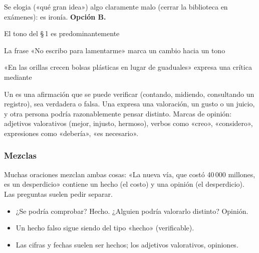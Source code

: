 \begin{retoresuelto}
Se elogia («qué gran idea») algo claramente malo (cerrar la biblioteca en exámenes): es ironía. \textbf{Opción B.}
\end{retoresuelto}

\taller
{}
\begin{ejercicios}
\item El tono del \S\,1 es predominantemente
\item La frase «No escribo para lamentarme»  marca un cambio hacia un tono
\item «En las orillas crecen bolsas plásticas en lugar de guaduales»  expresa una crítica mediante
\end{ejercicios}

\bitacora


Un  es una afirmación que se puede verificar (contando, midiendo, consultando un registro), sea verdadera o
falsa. Una  expresa una valoración, un gusto o un juicio, y otra persona podría razonablemente pensar
distinto. Marcas de opinión: adjetivos valorativos (mejor, injusto, hermoso), verbos como «creo», «considero»,
expresiones como «debería», «es necesario».

\subsubsection{Mezclas}
Muchas oraciones mezclan ambas cosas: «La nueva vía, que costó 40\,000 millones, es un desperdicio» contiene un hecho (el
costo) y una opinión (el desperdicio). Las preguntas suelen pedir separar.


\begin{regla}
\begin{itemize}
  \item ¿Se podría comprobar? Hecho. ¿Alguien podría valorarlo distinto? Opinión.
  \item Un hecho falso sigue siendo del tipo «hecho» (verificable).
  \item Las cifras y fechas suelen ser hechos; los adjetivos valorativos, opiniones.
\end{itemize}
\end{regla}

